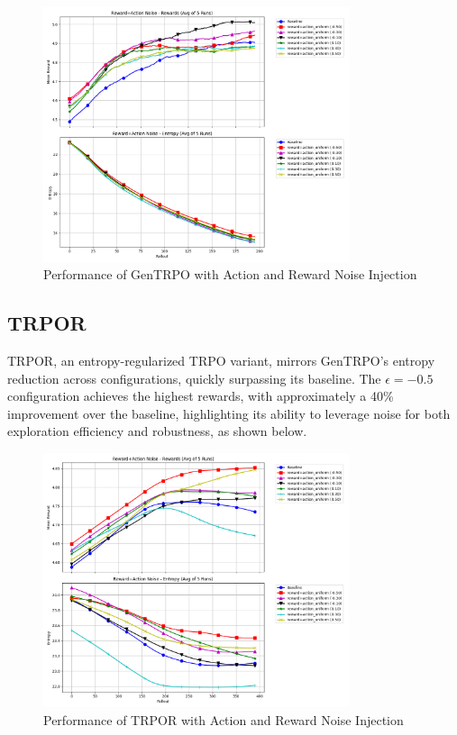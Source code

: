 \documentclass{svproc}
\begin{document}
\vspace*{-\baselineskip}
\begin{figure}[H]
    \centering
    \includegraphics[width=0.8\textwidth]{.assets/GenTRPO_100000_reward_action_5_runs.png}
    \caption{Performance of GenTRPO with Action and Reward Noise Injection}
\end{figure}
\vspace*{-\baselineskip}

\subsection{TRPOR}

TRPOR, an entropy-regularized TRPO variant, mirrors GenTRPO’s entropy reduction across configurations, quickly surpassing its baseline. The \(\epsilon = -0.5\) configuration achieves the highest rewards, with approximately a 40\% improvement over the baseline, highlighting its ability to leverage noise for both exploration efficiency and robustness, as shown below.

\vspace*{-\baselineskip}
\begin{figure}[H]
    \centering
    \includegraphics[width=0.8\textwidth]{.assets/TRPOR_100000_reward_action_5_runs_resmoothed.png}
    \caption{Performance of TRPOR with Action and Reward Noise Injection}
\end{figure}
\vspace*{-\baselineskip}
\end{document}
